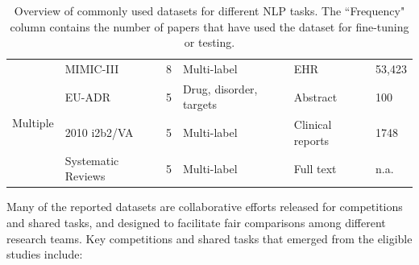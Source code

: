 \documentclass[fleqn,10pt]{olplainarticle}
\begin{document}
\begin{table}[htbp]
\begin{adjustbox}{max width=\textwidth}
\begin{tabular}{llllll}
\multirow{4}{*}{Multiple} & MIMIC-III & 8 & Multi-label & EHR & 53,423 \\
 & EU-ADR & 5 & Drug, disorder, targets & Abstract & 100 \\
 & 2010 i2b2/VA & 5 & Multi-label & Clinical reports & 1748 \\
 & Systematic Reviews & 5 & Multi-label & Full text & n.a. \\ \hline
\end{tabular}
\end{adjustbox}
\caption{Overview of commonly used datasets for different NLP tasks. The ``Frequency" column contains the number of papers that have used the dataset for fine-tuning or testing.}
\label{table:common_datasets}
\end{table}

Many of the reported datasets are collaborative efforts released for competitions and shared tasks, and designed to facilitate fair comparisons among different research teams. Key competitions and shared tasks that emerged from the eligible studies include:
\end{document}
